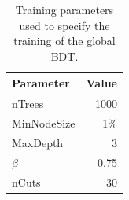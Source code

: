 \begin{table}[htbp]
\begin{center}
\begin{tabular}{lr}
\toprule \toprule
Parameter & Value \\ \midrule
nTrees & 1000 \\
MinNodeSize & 1$\%$ \\
MaxDepth & 3 \\
$\beta$ & 0.75 \\
nCuts & 30 \\
\bottomrule \bottomrule
\end{tabular}
\vspace{0.7cm}
\caption{Training parameters used to specify the training of the global BDT.}
\label{tab:BDTtrainingparams}
\end{center}
\vspace{-1.0cm}
\end{table}




